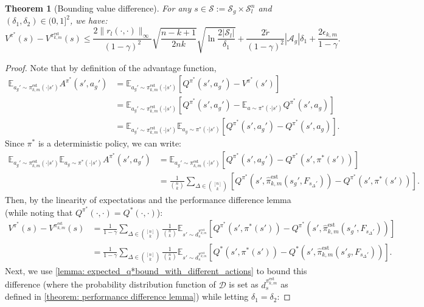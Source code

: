 \documentclass{article}
\theoremstyle{plain}
\newtheorem{theorem}{Theorem}[section]
\theoremstyle{definition}
\def\est{\mathrm{est}}
\def\E{\mathbb{E}}
\begin{document}
\begin{theorem}[Bounding value difference] For any $s\in\mathcal{S}:=\mathcal{S}_g\times\mathcal{S}_l^n$ and $(\delta_1,\delta_2)\in(0,1]^2$, we have: 
\[V^{\pi^*}(s) - V^{{{\pi}}^{\est}_{k,m}}(s) \leq \frac{2\|r_l(\cdot,\cdot)\|_\infty}{(1-\gamma)^2}\sqrt{\frac{n-k+1}{2nk}}\sqrt{\ln \frac{2|\mathcal{S}_l|}{\delta_1}} +  \frac{2\tilde{r}}{(1-\gamma)^2}|\mathcal{A}_g|\delta_1 + \frac{2\epsilon_{k,m}}{1-\gamma}.\]  
\end{theorem}
\begin{proof}
Note that by definition of the advantage function,
\begin{align*}
\E_{a_g'\sim {{\pi}}_{k,m}^{\est}(\cdot|s')} A^{{\pi}^*}(s',a_g') &= \E_{a_g'\sim {{\pi}}_{k,m}^{\est}(\cdot|s')}[Q^{{\pi}^*}(s',a_g') - V^{{\pi}^*}(s')] \\
&= \E_{a_g'\sim {{\pi}}_{k,m}^\est(\cdot|s')}[Q^{{\pi}^*}(s',a_g') - \E_{a\sim {\pi}^*(\cdot|s')} Q^{{\pi}^*}(s',a_g)] \\
&= \E_{a_g'\sim {{\pi}}_{k,m}^\est(\cdot|s')}\E_{a_g\sim {\pi}^*(\cdot|s')}[Q^{{\pi}^*}(s',a_g') - Q^{{\pi}^*}(s',a_g)].
\end{align*}
Since ${\pi}^*$ is a deterministic policy, we can write:
\begin{align*}
\E_{a_g'\sim {{\pi}}_{k,m}^\est(\cdot|s')}\E_{a_g\sim {\pi}^*(\cdot|s')} A^{{\pi}^*}(s',a_g') &= \E_{a_g'\sim {{\pi}}_{k,m}^\est(\cdot|s')}[Q^{{\pi}^*}(s',a_g') - Q^{{\pi}^*}(s',{\pi}^*(s'))] \\
&= \frac{1}{\binom{n}{k}}\sum_{\Delta\in\binom{[n]}{k}}[Q^{{\pi}^*}(s',\hat{\pi}^\est_{k,m}(s_g',F_{s_\Delta'})) - Q^{{\pi}^*}(s',{\pi}^*(s'))].
\end{align*}
\noindent Then, by the linearity of expectations and the performance difference lemma (while noting that $Q^{\pi^*}(\cdot,\cdot) = Q^*(\cdot,\cdot)$):
\begin{align*} V^{{\pi}^*}(s) - V^{{{\pi}}_{k,m}^\est}(s) &= \frac{1}{1-\gamma}\sum_{\Delta\in\binom{[n]}{k}}\frac{1}{\binom{n}{k}}\E_{s'\sim d_s^{{{\pi}}_{k,m}^\est}}\left[Q^{{\pi}^*}(s',{\pi}^*(s')) - Q^{{\pi}^*}(s',{\hat{\pi}}_{k,m}^\est(s_g', F_{s_\Delta'}))\right] \\
&= \frac{1}{1-\gamma}\sum_{\Delta\in\binom{[n]}{k}}\frac{1}{\binom{n}{k}}\E_{s'\sim d_s^{{{\pi}}_{k,m}^\est}}\left[Q^*(s',{\pi}^*(s')) - Q^*(s',{\hat{\pi}}_{k,m}^\est(s'_g,F_{s_\Delta'}))\right].
\end{align*}
Next, we use \cref{lemma: expected_q*bound_with_different_actions} to bound this difference (where the probability distribution function of $\mathcal{D}$ is set as $ d_s^{{\pi}_{k,m}^\est}$ as defined in \cref{theorem: performance difference lemma}) while letting $\delta_1=\delta_2$:

\end{proof}
\end{document}
